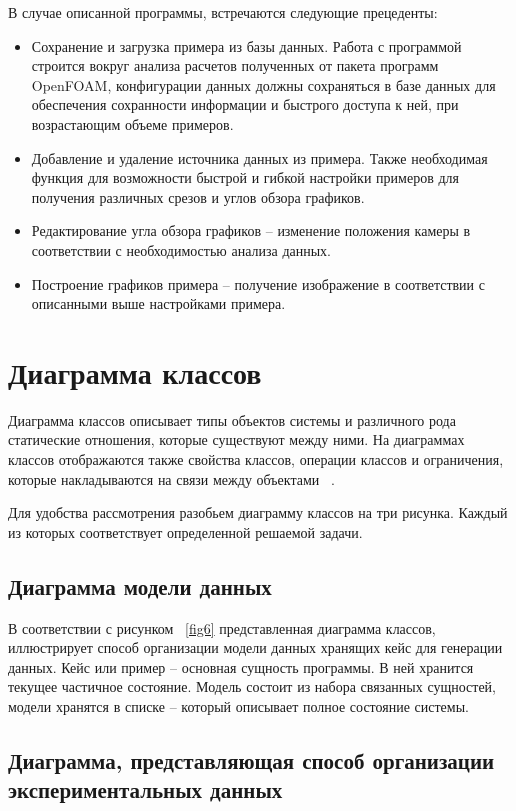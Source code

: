 \documentclass[14pt]{extreport}
\begin{document}
В случае описанной программы, встречаются следующие прецеденты:
\begin{itemize}
	\item Сохранение и загрузка примера из базы данных. Работа с программой строится вокруг анализа расчетов полученных от пакета программ OpenFOAM, конфигурации данных должны сохраняться в базе данных для обеспечения сохранности информации и быстрого доступа к ней, при возрастающим объеме примеров. 
	\item Добавление и удаление источника данных из примера. Также необходимая функция для возможности быстрой и гибкой настройки примеров для получения различных срезов и углов обзора графиков.
	\item Редактирование угла обзора графиков -- изменение положения камеры в соответствии с необходимостью анализа данных.
	\item Построение графиков примера -- получение изображение в соответствии с описанными выше настройками примера.
\end{itemize}

\section{Диаграмма классов}
Диаграмма классов описывает типы объектов системы и различного рода статические отношения, которые существуют между ними. На диаграммах классов отображаются также свойства классов, операции классов и ограничения, которые накладываются на связи между объектами ~\cite{umlDistilled}.

Для удобства рассмотрения разобьем диаграмму классов на три рисунка. Каждый из которых соответствует определенной решаемой задачи. 

\subsection{Диаграмма модели данных}
В соответствии с рисунком ~\ref{fig6} представленная диаграмма классов,
иллюстрирует способ организации модели данных хранящих кейс для генерации данных. Кейс или пример -- основная сущность программы. В ней хранится текущее частичное состояние. Модель состоит из набора связанных сущностей, модели хранятся в списке -- который описывает полное состояние системы.



\subsection{Диаграмма, представляющая способ организации экспериментальных данных}
\end{document}
